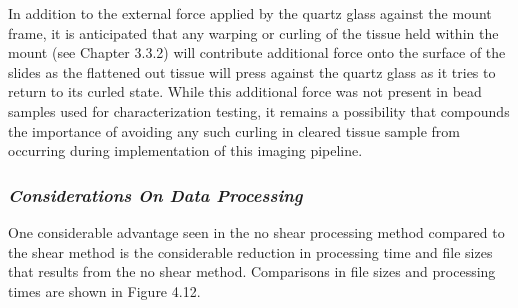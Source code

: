 In addition to the external force applied by the quartz glass against the mount frame, it is anticipated that any warping or curling of the tissue held within the mount (see Chapter 3.3.2) will contribute additional force onto the surface of the slides as the flattened out tissue will press against the quartz glass as it tries to return to its curled state. While this additional force was not present in bead samples used for characterization testing, it remains a possibility that compounds the importance of avoiding any such curling in cleared tissue sample from occurring during implementation of this imaging pipeline.

\subsubsection{\textit{Considerations On Data Processing}}

One considerable advantage seen in the no shear processing method compared to the shear method is the considerable reduction in processing time and file sizes that results from the no shear method. Comparisons in file sizes and processing times are shown in Figure 4.12.


